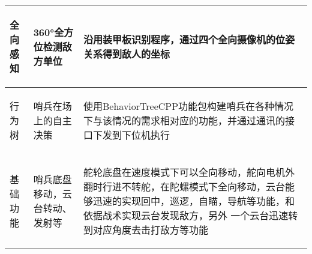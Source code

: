 \begin{longtable}{ p{2cm} | p{7.8cm} | p{6cm} |}
    \hline
    
        \begin{center}
            全向感知 
        \end{center} \cellcolor{gndcolor} &
        \begin{center}
            360°全方位检测敌方单位
        \end{center} \cellcolor{gndcolor} &
        \begin{center}
            沿用装甲板识别程序，通过四个全向摄像机的位姿关系得到敌人的坐标
        \end{center} \cellcolor{gndcolor} \\

    \hline
    
        \begin{center}
            行为树
        \end{center} &
        \begin{center}
            哨兵在场上的自主决策
        \end{center} &
        \begin{center}
            使用BehaviorTreeCPP功能包构建哨兵在各种情况下与该情况的需求相对应的功能，并通过通讯的接口下发到下位机执行
        \end{center} \\
        
    \hline
    
        \begin{center}
            基础功能
        \end{center} &
        \begin{center}
            哨兵底盘移动，云台转动、发射等
        \end{center} &
        \begin{center}
            舵轮底盘在速度模式下可以全向移动，舵向电机外翻时行进不转舵，在陀螺模式下全向移动，云台能够迅速的实现回中，巡逻，自瞄，导航等功能，和依据战术实现云台发现敌方，另外 一个云台迅速转到对应角度去击打敌方等功能
        \end{center} \\
        
    \hline
    
\end{longtable}
